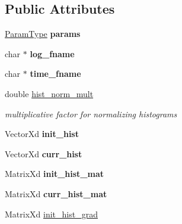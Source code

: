 \subsection*{Public Attributes}
\begin{DoxyCompactItemize}
\item 
\hypertarget{classKLD_a67e07721f65c35580e2475e793a8f25b}{\hyperlink{structKLDParams}{Param\-Type} {\bfseries params}}\label{classKLD_a67e07721f65c35580e2475e793a8f25b}

\item 
\hypertarget{classKLD_aa38772b2094604d7557b9442ef7de090}{char $\ast$ {\bfseries log\-\_\-fname}}\label{classKLD_aa38772b2094604d7557b9442ef7de090}

\item 
\hypertarget{classKLD_adf9be2ea35800f2df177d03ec0c8533a}{char $\ast$ {\bfseries time\-\_\-fname}}\label{classKLD_adf9be2ea35800f2df177d03ec0c8533a}

\item 
\hypertarget{classKLD_a6b33ebf72caaeaa17a4ed01897b07009}{double \hyperlink{classKLD_a6b33ebf72caaeaa17a4ed01897b07009}{hist\-\_\-norm\-\_\-mult}}\label{classKLD_a6b33ebf72caaeaa17a4ed01897b07009}

\begin{DoxyCompactList}\small\item\em multiplicative factor for normalizing histograms \end{DoxyCompactList}\item 
\hypertarget{classKLD_a7f69c70f4eea0faa4753af83277e772d}{Vector\-Xd {\bfseries init\-\_\-hist}}\label{classKLD_a7f69c70f4eea0faa4753af83277e772d}

\item 
\hypertarget{classKLD_a61dd5dc80ba9bd04cb28b6eade58f70b}{Vector\-Xd {\bfseries curr\-\_\-hist}}\label{classKLD_a61dd5dc80ba9bd04cb28b6eade58f70b}

\item 
\hypertarget{classKLD_abf07aa28ddb108311265b475e49ac987}{Matrix\-Xd {\bfseries init\-\_\-hist\-\_\-mat}}\label{classKLD_abf07aa28ddb108311265b475e49ac987}

\item 
\hypertarget{classKLD_abbdeec5b0bb1006a1d907d1cdd99aa8e}{Matrix\-Xd {\bfseries curr\-\_\-hist\-\_\-mat}}\label{classKLD_abbdeec5b0bb1006a1d907d1cdd99aa8e}

\item 
\hypertarget{classKLD_a67cc62a69bdf3cd4e18358ed62c84ea1}{Matrix\-Xd \hyperlink{classKLD_a67cc62a69bdf3cd4e18358ed62c84ea1}{init\-\_\-hist\-\_\-grad}}\label{classKLD_a67cc62a69bdf3cd4e18358ed62c84ea1}


\end{DoxyCompactItemize}
